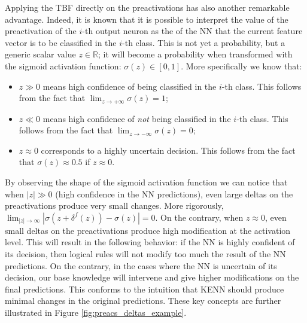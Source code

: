 Applying the TBF directly on the preactivations has also another remarkable advantage. Indeed, it is known that it is  possible to interpret the value of the preactivation of the $i$-th output neuron as the  of the NN that the current feature vector is to be classified in the $i$-th class. This  is not yet a probability, but a generic scalar value $z \in \mathbb{R}$; it will become a probability when transformed with the sigmoid activation function: $\sigma(z) \in \left[0,1\right]$. More specifically we know that:
\begin{itemize}
	\item $z \gg 0$ means high confidence of being classified in the $i$-th class. This follows from the fact that $\lim_{z\rightarrow +\infty} \sigma(z) = 1$;
	\item $z \ll 0$ means high confidence of \textit{not} being classified in the $i$-th class. This follows from the fact that $\lim_{z\rightarrow -\infty} \sigma(z) = 0$;
	\item $z \approx 0$ corresponds to a highly uncertain decision. This follows from the fact that $\sigma(z) \approx 0.5$ if $z \approx 0$.
\end{itemize}

By observing the shape of the sigmoid activation function we can notice that when $|z| \gg 0$ (high confidence in the NN predictions), even large deltas on the preactivations produce very small changes. More rigorously, $\lim_{|z| \rightarrow \infty} |\sigma(z+\delta^f(z))-\sigma(z)| = 0$. On the contrary, when $z \approx 0$, even small deltas on the preactivations produce high modification at the activation level. 
This will result in the following behavior: if the NN is highly confident of its decision, then logical rules will not modify too much the result of the NN predictions. On the contrary, in the cases where the NN is uncertain of its decision, our base knowledge will intervene and give higher modifications on the final predictions. This conforms to the intuition that KENN should produce minimal changes in the original predictions. These key concepts are further illustrated in Figure \ref{fig:preacs_deltas_example}.

